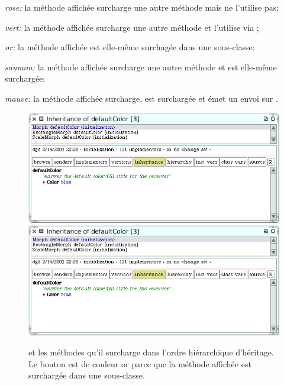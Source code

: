 \documentclass[a4paper,10pt,twoside]{book}
\begin{document}
\newcommand{\colourTag}[1]{\item[{\mdseries \itshape #1}]}

\begin{description}[noitemsep, leftmargin=*, labelindent=6em, labelwidth=4em, labelsep=*]
	\colourTag{rose:} la m\'ethode affich\'ee surcharge une autre m\'ethode mais ne l'utilise pas;
	\colourTag{vert:} la m\'ethode affich\'ee surcharge une autre m\'ethode et l'utilise via \super;
	\colourTag{or:} la m\'ethode affich\'ee est elle-m\^eme surchag\'ee dans une sous-classe;
	\colourTag{saumon:} la m\'ethode affich\'ee surcharge une autre m\'ethode et est elle-m\^eme surcharg\'ee;
	\colourTag{mauve:} la m\'ethode affich\'ee surcharge, est surcharg\'ee et \'emet un envoi sur .
\end{description}

\begin{figure}[tbp]
	\begin{center}
   \ifluluelse
		{\includegraphics[width=\textwidth]{inheritanceOverriding}}
		{\includegraphics[scale=0.7]{inheritanceOverriding}}
	\end{center}
	\caption{ et les m\'ethodes qu'il surcharge dans l'ordre hi\'erarchique d'h\'eritage. 
	Le bouton  est de couleur or parce que la m\'ethode affich\'ee est surcharg\'ee dans une sous-classe.}
	\label{fig:inheritanceOverriding}
\end{figure}
\end{document}
